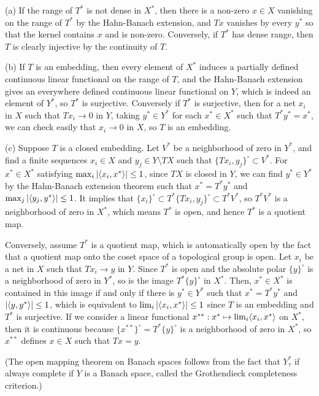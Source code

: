 \documentclass{../../large}
\begin{document}
\begin{pf}
(a)
If the range of $T^*$ is not dense in $X^*$, then there is a non-zero $x\in X$ vanishing on the range of $T^*$ by the Hahn-Banach extension, and $Tx$ vanishes by every $y^*$ so that the kernel contains $x$ and is non-zero.
Conversely, if $T^*$ has dense range, then $T$ is clearly injective by the continuity of $T$.

(b)
If $T$ is an embedding, then every element of $X^*$ induces a partially defined continuous linear functional on the range of $T$, and the Hahn-Banach extension gives an everywhere defined continuous linear functional on $Y$, which is indeed an element of $Y^*$, so $T^*$ is surjective.
Conversely if $T^*$ is surjective, then for a net $x_i$ in $X$ such that $Tx_i\to0$ in $Y$, taking $y^*\in Y^*$ for each $x^*\in X^*$ such that $T^*y^*=x^*$, we can check easily that $x_i\to0$ in $X$, so $T$ is an embedding.

(c)
Suppose $T$ is a closed embedding.
Let $V^*$ be a neighborhood of zero in $Y^*$, and find a finite sequences $x_i\in X$ and $y_j\in Y\setminus TX$ such that $\{Tx_i,y_j\}^\circ\subset V^*$.
For $x^*\in X^*$ satisfying $\max_i|\langle x_i,x^*\rangle|\le1$, since $TX$ is closed in $Y$, we can find $y^*\in Y^*$ by the Hahn-Banach extension theorem such that $x^*=T^*y^*$ and $\max_j|\langle y_j,y^*\rangle|\le1$.
It implies that $\{x_i\}^\circ\subset　T^*\{Tx_i,y_j\}^\circ\subset T^*V^*$, so $T^*V^*$ is a neighborhood of zero in $X^*$, which means $T^*$ is open, and hence $T^*$ is a quotient map.

Conversely, assume $T^*$ is a quotient map, which is automatically open by the fact that a quotient map onto the coset space of a topological group is open.
Let $x_i$ be a net in $X$ such that $Tx_i\to y$ in $Y$.
Since $T^*$ is open and the absolute polar $\{y\}^\circ$ is a neighborhood of zero in $Y^*$, so is the image $T^*\{y\}^\circ$ in $X^*$.
Then, $x^*\in X^*$ is contained in this image if and only if there is $y^*\in Y^*$ such that $x^*=T^*y^*$ and $|\langle y,y^*\rangle|\le1$, which is equivalent to $\lim_i|\langle x_i,x^*\rangle|\le1$ since $T$ is an embedding and $T^*$ is surjective.
If we consider a linear functional $x^{**}:x^*\mapsto\lim_i\langle x_i,x^*\rangle$ on $X^*$, then it is continuous because $\{x^{**}\}^\circ=T^*\{y\}^\circ$ is a neighborhood of zero in $X^*$, so $x^{**}$ defines $x\in X$ such that $Tx=y$.


(The open mapping theorem on Banach spaces follows from the fact that $Y^*_\tau$ if always complete if $Y$ is a Banach space, called the Grothendieck completeness criterion.)

\end{pf}
\end{document}
